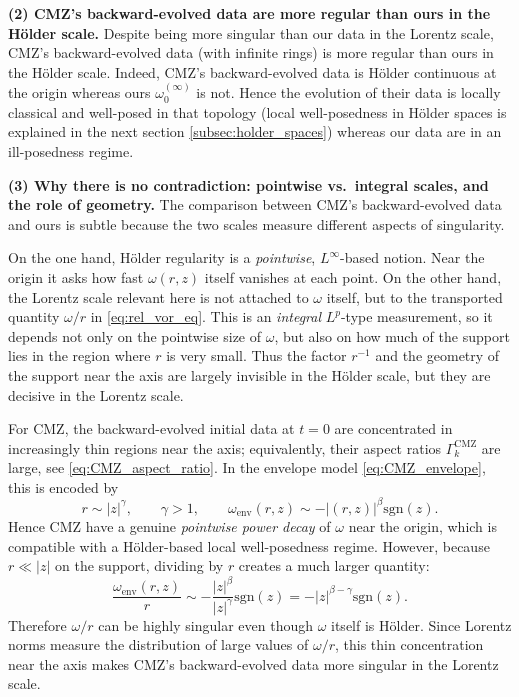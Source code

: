 \documentclass[reqno,11pt]{amsart}
\begin{document}
\medskip
\noindent\textbf{(2) CMZ's backward-evolved data are more regular than ours in the H\"older scale.}
Despite being more singular than our data in the Lorentz scale, 
CMZ's backward-evolved data (with infinite rings) is more regular than ours in the H\"older scale. Indeed, CMZ's backward-evolved data is H\"older continuous at the origin whereas ours $\omega_0^{(\infty)}$ is not. Hence the evolution of their data is locally classical and well-posed in that topology (local well-posedness in H\"older spaces is explained in the next section \ref{subsec:holder_spaces}) whereas our data are in an ill-posedness regime.



\medskip
\noindent\textbf{(3) Why there is no contradiction: pointwise vs.\ integral scales, and the role of geometry.}
The comparison between CMZ's backward-evolved data and ours is subtle because the two scales measure
different aspects of singularity.

On the one hand, H\"older regularity is a \emph{pointwise}, $L^\infty$-based notion.
Near the origin it asks how fast $\omega(r,z)$ itself vanishes at each point.
On the other hand, the Lorentz scale relevant here is not attached to $\omega$ itself,
but to the transported quantity $\omega/r$ in \eqref{eq:rel_vor_eq}.  This is an
\emph{integral} $L^p$-type measurement, so it depends not only on the pointwise size of
$\omega$, but also on how much of the support lies in the region where $r$ is very small.
Thus the factor $r^{-1}$ and the geometry of the support near the axis are largely
invisible in the H\"older scale, but they are decisive in the Lorentz scale.

For CMZ, the backward-evolved initial data at $t=0$ are concentrated in increasingly thin regions near
the axis; equivalently, their aspect ratios $\Gamma_k^{\mathrm{CMZ}}$ are large, see
\eqref{eq:CMZ_aspect_ratio}.  In the envelope model \eqref{eq:CMZ_envelope}, this is
encoded by
\[
r\sim |z|^\gamma,\qquad \gamma>1,
\qquad
\omega_{\mathrm{env}}(r,z)\sim -|(r,z)|^\beta\mathrm{sgn}(z) .
\]
Hence CMZ have a genuine \emph{pointwise power decay} of $\omega$ near the origin, which
is compatible with a H\"older-based local well-posedness regime.  However, because
$r\ll |z|$ on the support, dividing by $r$ creates a much larger quantity:
\[
\frac{\omega_{\mathrm{env}}(r,z)}{r}
\sim
-\frac{|z|^\beta}{|z|^\gamma}\mathrm{sgn}(z)
=
-|z|^{\beta-\gamma}\mathrm{sgn}(z).
\]
Therefore $\omega/r$ can be highly singular even though $\omega$ itself is H\"older.
Since Lorentz norms measure the distribution of large values of $\omega/r$, this thin
concentration near the axis makes CMZ's backward-evolved data more singular in the Lorentz scale.
\end{document}
